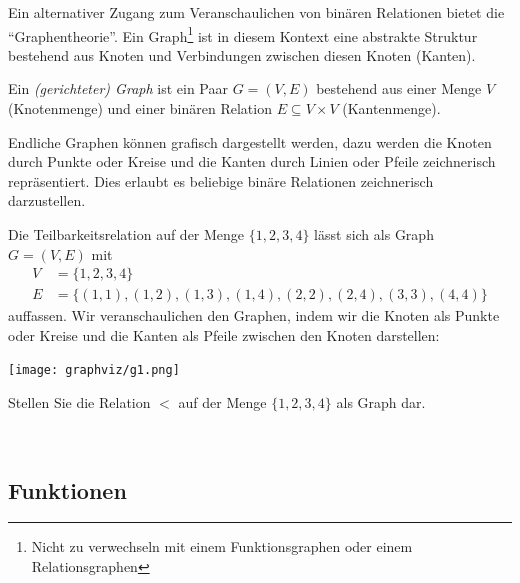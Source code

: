 Ein alternativer Zugang zum Veranschaulichen von binären Relationen bietet die ``Graphentheorie''. Ein Graph\footnote{Nicht zu verwechseln mit einem Funktionsgraphen oder einem
Relationsgraphen} ist in diesem Kontext eine abstrakte Struktur bestehend aus Knoten und Verbindungen zwischen diesen Knoten (Kanten).

\begin{df}
    Ein \textit{(gerichteter) Graph} ist ein Paar $G=(V,E)$ bestehend aus einer Menge $V$ (Knotenmenge)
    und einer binären Relation $E\subseteq V\times V$ (Kantenmenge).
\end{df}

Endliche Graphen können grafisch dargestellt werden, dazu werden die Knoten durch Punkte oder Kreise und die Kanten durch Linien oder Pfeile zeichnerisch repräsentiert. Dies erlaubt es beliebige binäre Relationen zeichnerisch darzustellen.

\begin{bsp}
    Die Teilbarkeitsrelation auf der Menge $\{1,2,3,4\}$ lässt sich als Graph
    $G=(V,E)$ mit
    \begin{align*}
    V &= \{1,2,3,4\}\\
    E &= \{(1,1),(1,2),(1,3),(1,4),(2,2),(2,4),(3,3),(4,4)\}
    \end{align*}
    auffassen. Wir veranschaulichen den Graphen, indem wir die Knoten als Punkte oder Kreise
    und die Kanten als Pfeile zwischen den Knoten darstellen:

    \begin{center}
            \texttt{[image: graphviz/g1.png]}
    \end{center}


\end{bsp}

\begin{ueb}
    Stellen Sie die Relation $<$ auf der Menge $\{1,2,3,4\}$ als Graph dar.
\end{ueb}
\begin{lsg}~
    {~\answerspace{5cm}}
\end{lsg}

\subsection{Funktionen}

